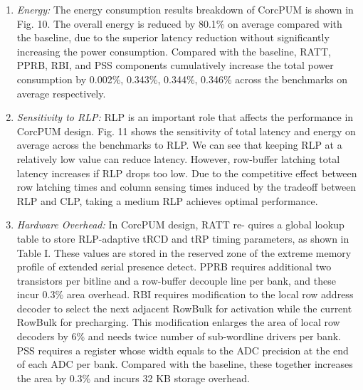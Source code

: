 \documentclass{article}
\begin{document}
\begin{itemize}
\begin{enumerate}
 					\item \textit{Energy:} The energy consumption results breakdown of
 					CorcPUM is shown in Fig. 10. The overall energy is reduced
 					by 80.1\% on average compared with the baseline, due to
 					the superior latency reduction without significantly increasing
 					the power consumption. Compared with the baseline, RATT,
 					PPRB, RBI, and PSS components cumulatively increase the
 					total power consumption by 0.002\%, 0.343\%, 0.344\%, 0.346\%
 					across the benchmarks on average respectively.
 					
 					\item \textit{Sensitivity to RLP:} RLP is an important role that affects
 					the performance in CorcPUM design. Fig. 11 shows the
 					sensitivity of total latency and energy on average across the
 					benchmarks to RLP. We can see that keeping RLP at a
 					relatively low value can reduce latency. However, row-buffer
 					latching total latency increases if RLP drops too low. Due to
 					the competitive effect between row latching times and column
 					sensing times induced by the tradeoff between RLP and CLP,
 					taking a medium RLP achieves optimal performance.
 					
 					\item \textit{Hardware Overhead:} In CorcPUM design, RATT re-
 					quires a global lookup table to store RLP-adaptive tRCD and
 					tRP timing parameters, as shown in Table I. These values are
 					stored in the reserved zone of the extreme memory profile of extended serial presence detect. PPRB requires additional
 					two transistors per bitline and a row-buffer decouple line
 					per bank, and these incur 0.3\% area overhead. RBI requires
 					modification to the local row address decoder to select the next
 					adjacent RowBulk for activation while the current RowBulk
 					for precharging. This modification enlarges the area of local
 					row decoders by 6\% and needs twice number of sub-wordline
 					drivers per bank. PSS requires a register whose width equals
 					to the ADC precision at the end of each ADC per bank.
 					Compared with the baseline, these together increases the area
 					by 0.3\% and incurs 32 KB storage overhead.
 				\end{enumerate}
 		\end{itemize}
\end{document}
